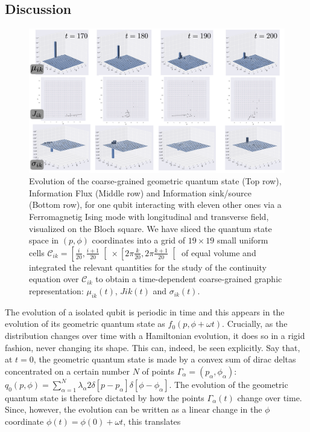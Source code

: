 \documentclass[draft,nofootinbib,pre,twocolumn,showpacs,showkeys,preprintnumbers,floatfix]{revtex4-1}
\newcommand{\1}{\mathbbm{1}}
\begin{document}
\subsection*{Discussion}
\begin{figure}[t!]
\centering
\includegraphics[width=.9\textwidth]{./img/summary.pdf}
\caption{Evolution of the coarse-grained geometric quantum state (Top row), Information Flux (Middle row)
	and Information sink/source (Bottom row), for one qubit interacting with eleven other ones via
	a Ferromagnetig Ising mode with longitudinal and transverse field, visualized on the Bloch square. 
	We have sliced the quantum state space in $(p,\phi)$ coordinates into a grid of $19 \times 19$ small 
	uniform cells $\mathcal{C}_{ik} = \left[\frac{i}{20},\frac{i+1}{20}\right[ \times \left[2\pi\frac{k}{20},2\pi \frac{k+1}{20}\right[$ of 
	equal volume and integrated the relevant quantities for the study of the continuity equation over $\mathcal{C}_{ik}$ 
	to obtain a time-dependent coarse-grained graphic representation: $\mu_{ik}(t)$, $J{ik}(t)$ and $\sigma_{ik}(t)$.
	}
\label{fig:summary}
\end{figure}
The evolution of a isolated qubit is periodic in time and this appears in the evolution 
of its geometric quantum state as $f_0(p,\phi+\omega t)$. Crucially, as the 
distribution changes over time with a Hamiltonian evolution, it does so in a 
rigid fashion, never changing its shape. This can, indeed, be seen explicitly. 
Say that, at $t=0$, the geometric quantum state is made by a convex sum
of dirac deltas concentrated on a certain number $N$ of points $\Gamma_\alpha = (p_\alpha,\phi_\alpha)$: 
$q_0(p,\phi) = \sum_{\alpha=1}^N \lambda_\alpha 2\delta\left[ p-p_\alpha\right] \delta\left[ \phi-\phi_\alpha\right]$.
The evolution of the geometric quantum state is therefore dictated by how 
the points $\Gamma_\alpha(t)$ change over time. Since, however, the evolution 
can be written as a linear change in the $\phi$ coordinate $\phi(t)=\phi(0)+\omega t$, this translates
\end{document}
